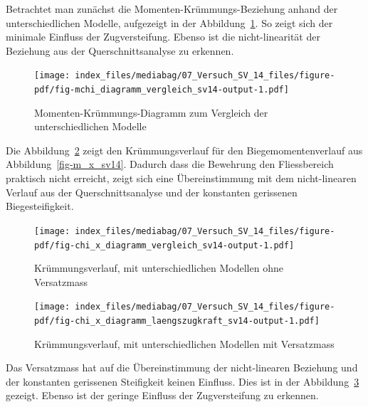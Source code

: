 \documentclass[
  12pt,
  letterpaper,
  egregdoesnotlikesansseriftitles]{scrreprt}
\begin{document}
Betrachtet man zunächst die Momenten-Krümmungs-Beziehung anhand der
unterschiedlichen Modelle, aufgezeigt in der
Abbildung~\ref{fig-mchi_diagramm_vergleich_sv14}. So zeigt sich der
minimale Einfluss der Zugversteifung. Ebenso ist die nicht-linearität
der Beziehung aus der Querschnittsanalyse zu erkennen.

\begin{figure}[H]

{\centering \texttt{[image: index\_files/mediabag/07\_Versuch\_SV\_14\_files/figure-pdf/fig-mchi\_diagramm\_vergleich\_sv14-output-1.pdf]}

}

\caption{\label{fig-mchi_diagramm_vergleich_sv14}Momenten-Krümmungs-Diagramm
zum Vergleich der unterschiedlichen Modelle}

\end{figure}

Die Abbildung~\ref{fig-chi_x_diagramm_vergleich_sv14} zeigt den
Krümmungsverlauf für den Biegemomentenverlauf aus
Abbildung~\ref{fig-m_x_sv14}. Dadurch dass die Bewehrung den
Fliessbereich praktisch nicht erreicht, zeigt sich eine Übereinstimmung
mit dem nicht-linearen Verlauf aus der Querschnittsanalyse und der
konstanten gerissenen Biegesteifigkeit.

\begin{figure}[H]

{\centering \texttt{[image: index\_files/mediabag/07\_Versuch\_SV\_14\_files/figure-pdf/fig-chi\_x\_diagramm\_vergleich\_sv14-output-1.pdf]}

}

\caption{\label{fig-chi_x_diagramm_vergleich_sv14}Krümmungsverlauf, mit
unterschiedlichen Modellen ohne Versatzmass}

\end{figure}

\begin{figure}[H]

{\centering \texttt{[image: index\_files/mediabag/07\_Versuch\_SV\_14\_files/figure-pdf/fig-chi\_x\_diagramm\_laengszugkraft\_sv14-output-1.pdf]}

}

\caption{\label{fig-chi_x_diagramm_laengszugkraft_sv14}Krümmungsverlauf,
mit unterschiedlichen Modellen mit Versatzmass}

\end{figure}

Das Versatzmass hat auf die Übereinstimmung der nicht-linearen Beziehung
und der konstanten gerissenen Steifigkeit keinen Einfluss. Dies ist in
der Abbildung~\ref{fig-chi_x_diagramm_laengszugkraft_sv14} gezeigt.
Ebenso ist der geringe Einfluss der Zugversteifung zu erkennen.
\end{document}
